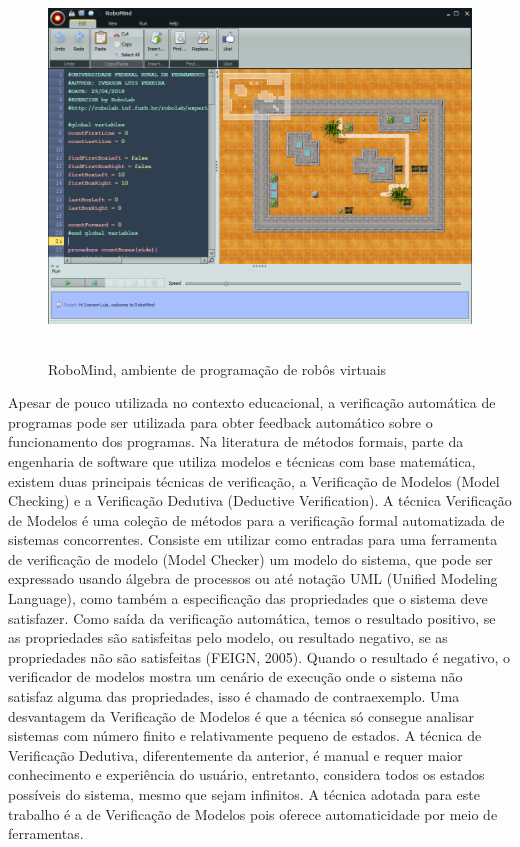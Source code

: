 \begin{figure}[h]
\centering
\includegraphics[height=10cm]{figuras/robomind_ide.png}
\caption{RoboMind, ambiente de programação de robôs virtuais}
\label{fig:robomind}
\end{figure}

Apesar de pouco utilizada no contexto educacional, a verificação automática de programas pode ser utilizada para obter feedback automático sobre o funcionamento dos programas. Na literatura de métodos formais, parte da engenharia de software que utiliza modelos e técnicas com base matemática, existem duas principais técnicas de verificação, a Verificação de Modelos (Model Checking) e a Verificação Dedutiva (Deductive Verification). A técnica Verificação de Modelos é uma coleção de métodos para a verificação formal automatizada de sistemas concorrentes.  Consiste em utilizar como entradas para uma ferramenta de verificação de modelo (Model Checker) um modelo do sistema, que pode ser expressado usando álgebra de processos ou até notação UML (Unified Modeling Language), como também a especificação das propriedades que o sistema deve satisfazer. Como saída da verificação automática, temos o resultado positivo, se as propriedades são satisfeitas pelo modelo, ou resultado negativo, se as propriedades não são satisfeitas (FEIGN, 2005). Quando o resultado é negativo, o verificador de modelos mostra um cenário de execução onde o sistema não satisfaz alguma das propriedades, isso é chamado de contraexemplo. Uma desvantagem da Verificação de Modelos é que a técnica só consegue analisar sistemas com número finito e relativamente pequeno de estados. A técnica de Verificação Dedutiva, diferentemente da anterior, é manual e requer maior conhecimento e experiência do usuário, entretanto, considera todos os estados possíveis do sistema, mesmo que sejam infinitos. A técnica adotada para este trabalho é a de Verificação de Modelos pois oferece automaticidade por meio de ferramentas.

